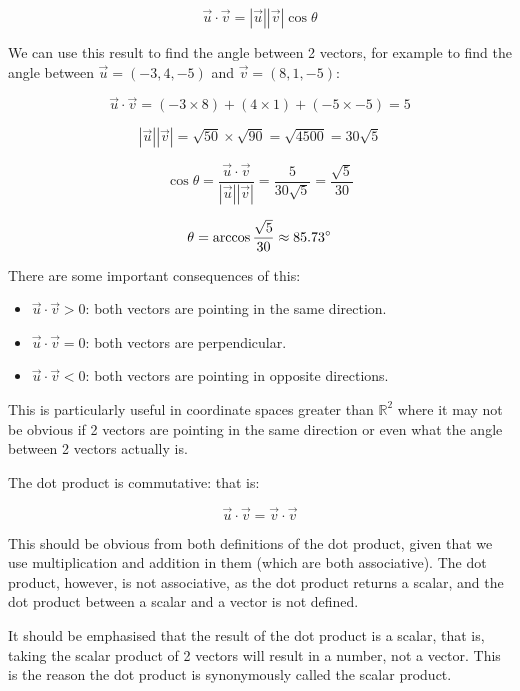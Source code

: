 \documentclass[a4paper,oneside]{report}
\begin{document}
\[ \overrightarrow{u} \cdot \overrightarrow{v} =
| \overrightarrow{u} | | \overrightarrow{v} | \cos{\theta} \]

We can use this result to find the angle between 2 vectors, for example to
find the angle between \( \overrightarrow{u} = (-3, 4, -5) \) and
\( \overrightarrow{v} = (8, 1, -5) \):

\[ \overrightarrow{u} \cdot \overrightarrow{v} = (-3 \times 8) + (4 \times 1)
+ (-5 \times -5) = 5 \]

\[ | \overrightarrow{u} | | \overrightarrow{v} | = \sqrt{50} \times \sqrt{90}
= \sqrt{4500} = 30 \sqrt{5} \]

\[ \cos{\theta} = \frac{\overrightarrow{u} \cdot \overrightarrow{v}}
{| \overrightarrow{u} | | \overrightarrow{v} |} = \frac{5}{30 \sqrt{5}} =
\frac{\sqrt{5}}{30} \]

\[ \theta = \arccos{\frac{\sqrt{5}}{30}} \approx 85.73 \degree \]

There are some important consequences of this:

\begin{itemize}
	\item{\( \overrightarrow{u} \cdot \overrightarrow{v} > 0 \): both
		vectors are pointing in the same direction.}
	\item{\( \overrightarrow{u} \cdot \overrightarrow{v} = 0 \): both
		vectors are perpendicular.}
	\item{\( \overrightarrow{u} \cdot \overrightarrow{v} < 0 \): both
		vectors are pointing in opposite directions.}
\end{itemize}

This is particularly useful in coordinate spaces greater than
\( \mathbb{R}^2 \) where it may not be obvious if 2 vectors are pointing in
the same direction or even what the angle between 2 vectors actually is.

The dot product is commutative: that is:

\[ \overrightarrow{u} \cdot \overrightarrow{v} = \overrightarrow{v} \cdot
\overrightarrow{v} \]

This should be obvious from both definitions of the dot product, given
that we use multiplication and addition in them (which are both associative).
The dot product, however, is not associative, as the dot product returns a
scalar, and the dot product between a scalar and a vector is not defined.

It should be emphasised that the result of the dot product is a scalar, that
is, taking the scalar product of 2 vectors will result in a number, not a
vector. This is the reason the dot product is synonymously called the scalar
product.
\end{document}
